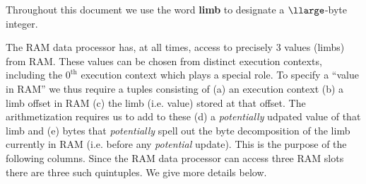 \noindent Throughout this document we use the word \textbf{limb}\label{def: limb} to designate a $\llarge$-byte integer.

The RAM data processor has, at all times, access to precisely 3 values (limbs) from RAM. These values can be chosen from distinct execution contexts, including the $0^{\text{th}}$ execution context which plays a special role. To specify a ``value in RAM'' we thus require a tuples consisting of (a) an execution context (b) a limb offset in RAM (c) the limb (i.e. value) stored at that offset. The arithmetization requires us to add to these (d) a \emph{potentially} udpated value of that limb and (e) bytes that \emph{potentially} spell out the byte decomposition of the limb currently in RAM (i.e. before any \emph{potential} update). This is the purpose of the following columns. Since the RAM data processor can access three RAM slots there are three such quintuples. We give more details below.


